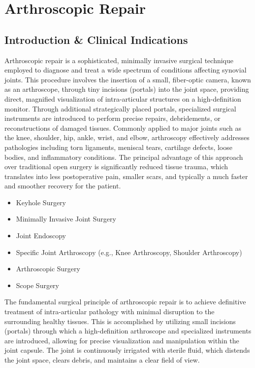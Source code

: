 \chapter{Arthroscopic Repair}

\section*{Introduction \& Clinical Indications}
Arthroscopic repair is a sophisticated, minimally invasive surgical technique employed to diagnose and treat a wide spectrum of conditions affecting synovial joints. This procedure involves the insertion of a small, fiber-optic camera, known as an arthroscope, through tiny incisions (portals) into the joint space, providing direct, magnified visualization of intra-articular structures on a high-definition monitor. Through additional strategically placed portals, specialized surgical instruments are introduced to perform precise repairs, debridements, or reconstructions of damaged tissues. Commonly applied to major joints such as the knee, shoulder, hip, ankle, wrist, and elbow, arthroscopy effectively addresses pathologies including torn ligaments, meniscal tears, cartilage defects, loose bodies, and inflammatory conditions. The principal advantage of this approach over traditional open surgery is significantly reduced tissue trauma, which translates into less postoperative pain, smaller scars, and typically a much faster and smoother recovery for the patient.

\begin{itemize}
  \item Keyhole Surgery
  \item Minimally Invasive Joint Surgery
  \item Joint Endoscopy
  \item Specific Joint Arthroscopy (e.g., Knee Arthroscopy, Shoulder Arthroscopy)
  \item Arthroscopic Surgery
  \item Scope Surgery
\end{itemize}

The fundamental surgical principle of arthroscopic repair is to achieve definitive treatment of intra-articular pathology with minimal disruption to the surrounding healthy tissues. This is accomplished by utilizing small incisions (portals) through which a high-definition arthroscope and specialized instruments are introduced, allowing for precise visualization and manipulation within the joint capsule. The joint is continuously irrigated with sterile fluid, which distends the joint space, clears debris, and maintains a clear field of view.

